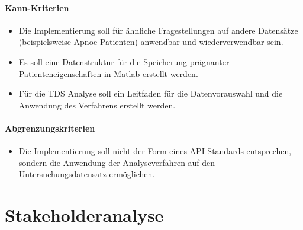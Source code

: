 \paragraph{Kann-Kriterien}
\begin{itemize}
\item Die Implementierung soll für ähnliche Fragestellungen auf andere Datensätze (beispielsweise Apnoe-Patienten) anwendbar und wiederverwendbar sein.
\item Es soll eine Datenstruktur für die Speicherung prägnanter Patienteneigenschaften in Matlab erstellt werden.
\item Für die \acs{TDS} Analyse soll ein Leitfaden für die Datenvorauswahl und die Anwendung des Verfahrens erstellt werden.
\end{itemize}

\paragraph{Abgrenzungskriterien}
\begin{itemize}
\item Die Implementierung soll nicht der Form eines API-Standards entsprechen, sondern die Anwendung der Analyseverfahren auf den Untersuchungsdatensatz ermöglichen. 
\end{itemize}

\section{Stakeholderanalyse}